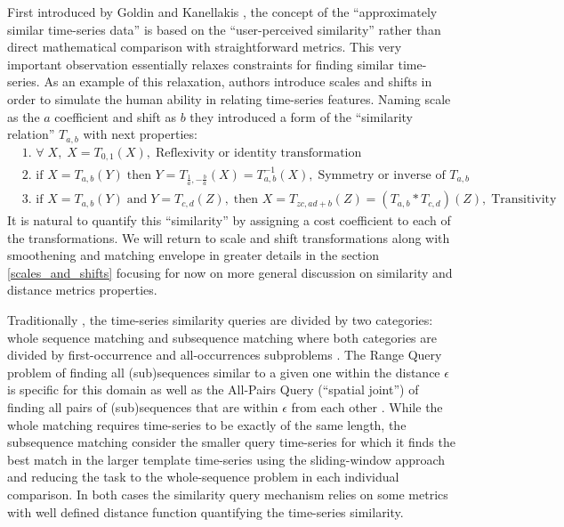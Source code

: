 First introduced by Goldin and Kanellakis \cite{citeulike:3815880}, the concept of the ``approximately similar time-series data'' is based on the ``user-perceived similarity'' rather than direct mathematical comparison with straightforward metrics. This very important observation essentially relaxes constraints for finding similar time-series. As an example of this relaxation, authors introduce scales and shifts in order to simulate the human ability in relating time-series features. Naming scale as the $a$ coefficient and shift as $b$ they introduced a form of the ``similarity relation'' $T_{a,b}$ with next properties:
\begin{align}
 & \text{1. } \forall \; X, \; X=T_{0,1}(X), \; \text{Reflexivity or identity transformation} \\
 & \text{2. } \text{if } X=T_{a,b}(Y) \; \text{then } Y=T_{\frac{1}{a},-\frac{b}{a}}(X) = T^{-1}_{a,b}(X), \; \text{Symmetry or inverse of $T_{a,b}$} \\
 & \text{3. } \text{if } X=T_{a,b}(Y) \; \text{and} \; Y=T_{c,d}(Z), \; \text{then } X=T_{zc, ad+b}(Z) = (T_{a,b} * T_{c,d})(Z), \; \text{Transitivity}
\end{align}
It is natural to quantify this ``similarity'' by assigning a cost coefficient to each of the transformations. We will return to scale and shift transformations along with smoothening and matching envelope in greater details in the section \ref{scales_and_shifts} focusing for now on more general discussion on similarity and distance metrics properties.

Traditionally \cite{citeulike:3973409}, the time-series similarity queries are divided by two categories: whole sequence matching and subsequence matching where both categories are divided by first-occurrence and all-occurrences subproblems \cite{citeulike:3815880}. The Range Query problem of finding all (sub)sequences similar to a given one within the distance $\epsilon$ is specific for this domain as well as the All-Pairs Query (``spatial joint'') of finding all pairs of (sub)sequences that are within $\epsilon$ from each other \cite{citeulike:3973409}. While the whole matching requires time-series to be exactly of the same length, the subsequence matching consider the smaller query time-series for which it finds the best match in the larger template time-series using the sliding-window approach and reducing the task to the whole-sequence problem in each individual comparison. In both cases the similarity query mechanism relies on some metrics with well defined distance function quantifying the time-series similarity. 

